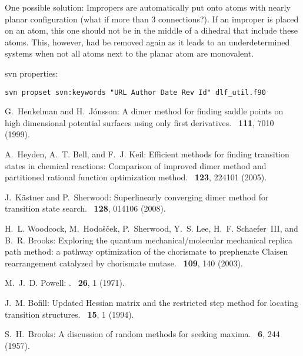 \documentclass{article}
\begin{document}
One possible solution: Impropers are automatically put onto atoms with nearly
planar configuration (what if more than 3 connections?). If an improper is
placed on an atom, this one should not be in the middle of a dihedral that
include these atoms. This, however, had be removed again as it leads to an
underdetermined systems when not all atoms next to the planar atom are
monovalent.

svn properties:

\verb'svn propset svn:keywords "URL Author Date Rev Id" dlf_util.f90'

%
%

\begin{thebibliography}{10}

G.~Henkelman and H.~J{\'o}nsson:
\newblock A dimer method for finding saddle points on high dimensional
  potential surfaces using only first derivatives.
~{\bf 111}, 7010  (1999).

A.~Heyden, A.~T. Bell, and F.~J. Keil:
\newblock Efficient methods for finding transition states in chemical
  reactions: Comparison of improved dimer method and partitioned rational
  function optimization method.
~{\bf 123}, 224101  (2005).

J.~K\"astner and P.~Sherwood:
\newblock Superlinearly converging dimer method for transition state search.
~{\bf 128}, 014106  (2008).

H.~L. Woodcock, M.~Hodo{\v s}{\v c}ek, P.~Sherwood, Y.~S. Lee, H.~F.
  Schaefer~III, and B.~R. Brooks:
\newblock Exploring the quantum mechanical/molecular mechanical replica path
  method: a pathway optimization of the chorismate to prephenate Claisen
  rearrangement catalyzed by chorismate mutase.
~{\bf 109}, 140  (2003).

M.~J.~D. Powell: .
~{\bf 26}, 1  (1971).

J.~M. Bofill:
\newblock Updated Hessian matrix and the restricted step method for locating
  transition structures.
~{\bf 15}, 1  (1994).

S.~H.~Brooks:
\newblock A discussion of random methods for seeking maxima.
~\textbf{6}, 244 (1957).


\end{thebibliography}
\end{document}
